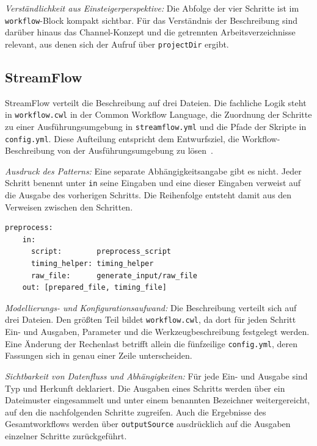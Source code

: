 \emph{Verständlichkeit aus Einsteigerperspektive:} Die Abfolge der
vier Schritte ist im \texttt{workflow}-Block kompakt sichtbar. Für das
Verständnis der Beschreibung sind darüber hinaus das Channel-Konzept
und die getrennten Arbeitsverzeichnisse relevant, aus denen sich der
Aufruf über \texttt{projectDir} ergibt.

\subsection{StreamFlow}
\label{sec:lokal:pipeline:streamflow}

StreamFlow verteilt die Beschreibung auf drei Dateien. Die fachliche
Logik steht in \texttt{workflow.cwl} in der Common Workflow Language,
die Zuordnung der Schritte zu einer Ausführungsumgebung in
\texttt{streamflow.yml} und die Pfade der Skripte in
\texttt{config.yml}. Diese Aufteilung entspricht dem Entwurfsziel,
die Workflow-Beschreibung von der Ausführungsumgebung zu
lösen~\cite[S.~1723]{colonnelli2021streamflow}.

\emph{Ausdruck des Patterns:} Eine separate Abhängigkeitsangabe gibt
es nicht. Jeder Schritt benennt unter \texttt{in} seine Eingaben und
eine dieser Eingaben verweist auf die Ausgabe des vorherigen
Schritts. Die Reihenfolge entsteht damit aus den Verweisen zwischen
den Schritten.

\begin{lstlisting}[caption={Verweis auf die Ausgabe des Vorgängers in workflow.cwl (StreamFlow, Pipeline)},label={lst:pipe:sf}]
  preprocess:
    in:
      script:        preprocess_script
      timing_helper: timing_helper
      raw_file:      generate_input/raw_file
    out: [prepared_file, timing_file]
\end{lstlisting}

\emph{Modellierungs- und Konfigurationsaufwand:} Die Beschreibung
verteilt sich auf drei Dateien. Den größten Teil bildet
\texttt{workflow.cwl}, da dort für jeden Schritt Ein- und Ausgaben,
Parameter und die Werkzeugbeschreibung festgelegt werden. Eine
Änderung der Rechenlast betrifft allein die fünfzeilige
\texttt{config.yml}, deren Fassungen sich in genau einer Zeile
unterscheiden.

\emph{Sichtbarkeit von Datenfluss und Abhängigkeiten:} Für jede Ein-
und Ausgabe sind Typ und Herkunft deklariert. Die Ausgaben eines
Schritts werden über ein Dateimuster eingesammelt und unter einem
benannten Bezeichner weitergereicht, auf den die nachfolgenden
Schritte zugreifen. Auch die Ergebnisse des Gesamtworkflows werden
über \texttt{outputSource} ausdrücklich auf die Ausgaben einzelner
Schritte zurückgeführt.

